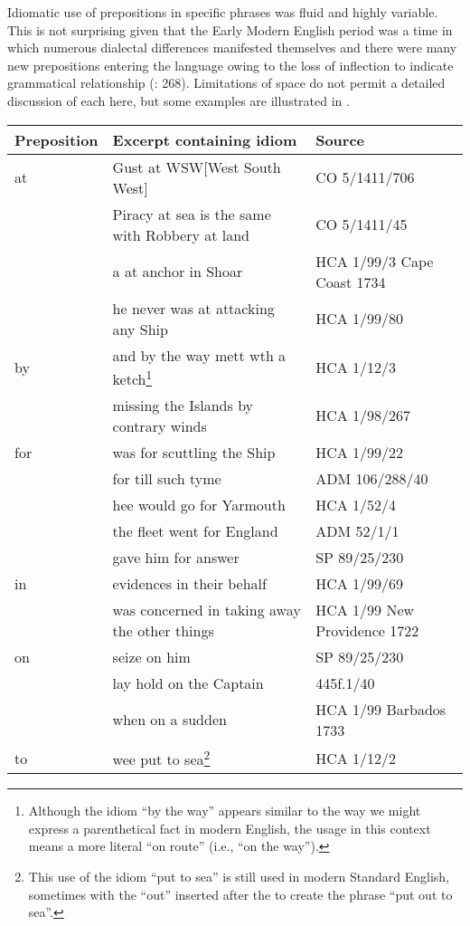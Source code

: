 Idiomatic use of prepositions in specific phrases was fluid and highly variable. This is not surprising given that the Early Modern English period was a time in which numerous dialectal differences manifested themselves and there were many new prepositions entering the language owing to the loss of inflection to indicate grammatical relationship (\citealt{MillwardHayes2012}: 268). Limitations of space do not permit a detailed discussion of each  here, but some examples are illustrated in . 

\begin{table}
\small
\begin{tabularx}{\textwidth}{lQl}
\lsptoprule
{\textbf{Preposition}} & \textbf{Excerpt containing idiom} & \textbf{Source}\\
\midrule 
{at} & Gust at WSW[West South West] & CO 5/1411/706\\
& Piracy at sea is the same with Robbery at land & CO 5/1411/45\\
 & a  at anchor in Shoar & HCA 1/99/3 Cape Coast {1734}\\
 & he never was at attacking any Ship & HCA 1/99/80 \\
{by} & and by the way mett wth a ketch\footnote{Although the idiom “by the way” appears similar to the way we might express a parenthetical fact in modern English, the usage in this context means a more literal “on route” (i.e., “on the way”).} & HCA 1/12/3\\
& missing the Islands by contrary winds & HCA 1/98/267\\
{for} & was for scuttling the Ship & HCA 1/99/22\\
& for till such tyme & ADM 106/288/40\\
 & hee would go for Yarmouth & HCA 1/52/4\\
 & the fleet went for England & ADM 52/1/1\\
 & gave him for answer & SP 89/25/230\\
{in} & evidences in their behalf & HCA 1/99/69\\
& was concerned in taking away the other things & HCA 1/99 New Providence 1722\\
{on} & seize on him & SP 89/25/230\\
& lay hold on the Captain & 445f.1/40\\
 & when on a sudden & HCA 1/99 Barbados {1733}\\
{to} & wee put to sea\footnote{This use of the idiom “put to sea” is still used in modern Standard English, sometimes with the  “out” inserted after the  to create the phrase “put out to sea”.} & HCA 1/12/2 \\

\end{tabularx}
\end{table}
